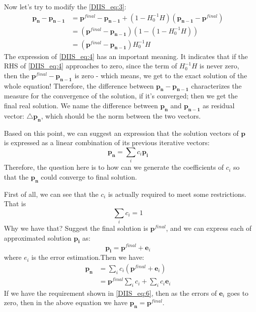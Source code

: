 Now let's try to modify the \ref{DIIS_eq:3}:
\begin{align}
 \label{DIIS_eq:4}
 \mathbf{p_{n}} - \mathbf{p_{n-1}} &= \mathbf{p}^{final} - \mathbf{p_{n-1}} + 
 (1-H_{0}^{-1}H)(\mathbf{p_{n-1}} - \mathbf{p}^{final}) \nonumber \\
 &= (\mathbf{p}^{final} - \mathbf{p_{n-1}})(1-(1-H_{0}^{-1}H)) \nonumber \\
 &= (\mathbf{p}^{final} - \mathbf{p_{n-1}})H_{0}^{-1}H
\end{align}
The expression of \ref{DIIS_eq:4} has an important meaning. It indicates that
if the RHS of \ref{DIIS_eq:4} approaches to zero, since
the term of $H_{0}^{-1}H$ is never zero, then the $\mathbf{p}^{final} - \mathbf{p_{n-1}}$ 
is zero - which means, we get to the exact solution of the whole equation! 
Therefore, the difference between $\mathbf{p_{n}} - \mathbf{p_{n-1}}$ characterizes the 
measure for the convergence of the solution, if it's converged; then we get the final
real solution. We name the difference between
$\mathbf{p_{n}}$ and $\mathbf{p_{n-1}}$ as residual vector: $\triangle \mathbf{p_{n}}$, which
should be the norm between the two vectors.

Based on this point, we can suggest an expression that the solution vectors
of $\mathbf{p}$ is expressed as a linear combination of its previous iterative 
vectors:
\begin{equation}
 \label{DIIS_eq:5}
 \mathbf{p_{n}} = \sum_{i}c_{i}\mathbf{p_{i}}
\end{equation}
Therefore, the question here is to how can we generate the coefficients of 
$c_{i}$ so that the $\mathbf{p_{n}}$ could converge to final solution.

First of all, we can see that the $c_{i}$ is actually required to meet some
restrictions. That is 
\begin{equation}
 \label{DIIS_eq:6}
 \sum_{i}c_{i} = 1
\end{equation}
Why we have that? Suggest the final solution is $\mathbf{p}^{final}$,
and we can express each of approximated solution $\mathbf{p_{i}}$ as:
\begin{equation}
 \mathbf{p_{i}} = \mathbf{p}^{final} + \mathbf{e}_{i}
\end{equation}
where $e_{i}$ is the error estimation.Then we have:
\begin{align}
\label{DIIS_eq:7}
 \mathbf{p_{n}} &= \sum_{i}c_{i}(\mathbf{p}^{final} + \mathbf{e}_{i}) \nonumber \\
 &= \mathbf{p}^{final}\sum_{i}c_{i} + \sum_{i}c_{i}\mathbf{e}_{i}
\end{align}
If we have the requirement shown in \ref{DIIS_eq:6}, then as the errors of $\mathbf{e}_{i}$
goes to zero, then in the above equation we have $\mathbf{p_{n}} = \mathbf{p}^{final}$.

